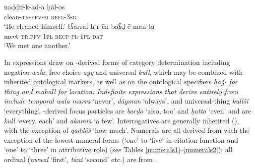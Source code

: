 \documentclass[output=paper]{langsci/langscibook}
\begin{document}
\ea \gll naḍḍif-k-ad-a ḥāl-os\\
     clean-\textsc{tr-pfv-m} \textsc{refl-3sg}\\
\glt ‘He cleaned himself.’
\ex \gll tʕarraf-h-r-ēn baʕḍ-ē-man-ta\\
     meet-\textsc{tr.pfv-1pl} \textsc{recp-pl-1pl-dat}\\
\glt ‘We met one another.’
\z

In expressions draw on -derived forms of category determination including negative \textit{wala}, free choice \textit{ayy} and universal \textit{kull}, which may be combined with inherited ontological markers, as well as on the ontological specifiers \textit{ḥāǧ- \textup{for thing and} maḥall \textup{for location. Indefinite expressions that derive entirely from  include temporal} wala marra} {{‘never’,} \textit{dāyman} \textup{‘always’, and universal-thing} \textit{kullši} \textup{‘everything’. -derived} }focus particles are \textit{barḍo} ‘also, too’ and \textit{ḥatta} ‘even’ and  are \textit{kull} ‘every, each’ and \textit{akamm} ‘a few’. Interrogatives are generally inherited (), with the exception of \textit{qaddēš} ‘how much’. Numerals are all derived from  with the exception of the lowest numeral forms (`one' to `five' in citation function and `one' to `three' in attributive role) (see Tables \ref{numerals1}–\ref{numerals2}); all ordinal  (\textit{awwal} ‘first’, \textit{tāni} `second' etc.) are from .
\end{document}
